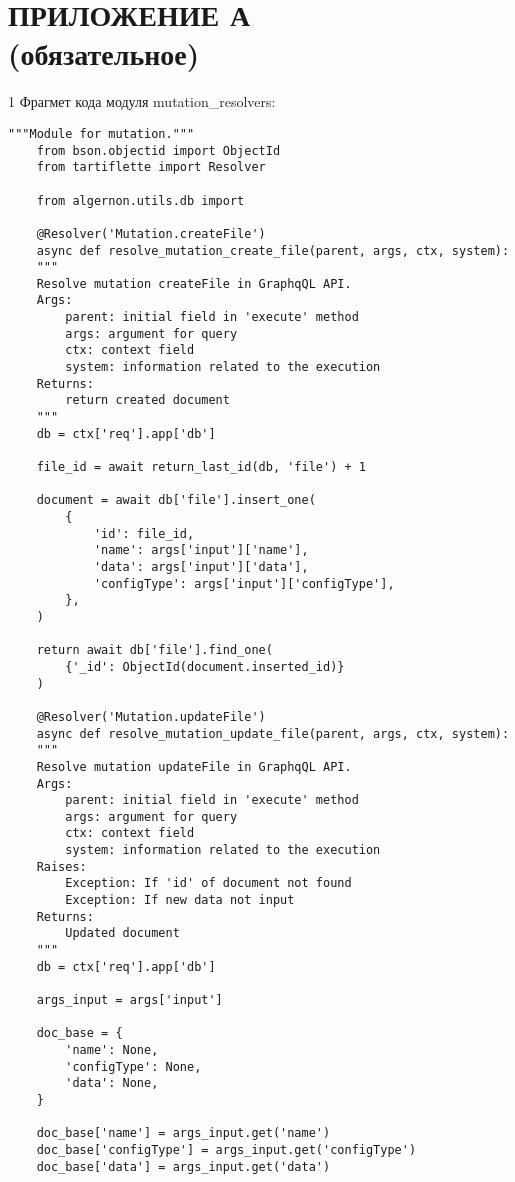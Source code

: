 \section*{\hfill ПРИЛОЖЕНИЕ А \\ \hspace*{13.5cm} (обязательное)}


1 Фрагмет кода модуля mutation\_resolvers:

\begin{Verbatim}[fontsize=\footnotesize]
    """Module for mutation."""
    from bson.objectid import ObjectId
    from tartiflette import Resolver

    from algernon.utils.db import 

    @Resolver('Mutation.createFile')
    async def resolve_mutation_create_file(parent, args, ctx, system):
    """
    Resolve mutation createFile in GraphqQL API.
    Args:
        parent: initial field in 'execute' method
        args: argument for query
        ctx: context field
        system: information related to the execution
    Returns:
        return created document
    """
    db = ctx['req'].app['db']

    file_id = await return_last_id(db, 'file') + 1

    document = await db['file'].insert_one(
        {
            'id': file_id,
            'name': args['input']['name'],
            'data': args['input']['data'],
            'configType': args['input']['configType'],
        },
    )

    return await db['file'].find_one(
        {'_id': ObjectId(document.inserted_id)}
    )

    @Resolver('Mutation.updateFile')
    async def resolve_mutation_update_file(parent, args, ctx, system):
    """
    Resolve mutation updateFile in GraphqQL API.
    Args:
        parent: initial field in 'execute' method
        args: argument for query
        ctx: context field
        system: information related to the execution
    Raises:
        Exception: If 'id' of document not found
        Exception: If new data not input
    Returns:
        Updated document
    """
    db = ctx['req'].app['db']

    args_input = args['input']

    doc_base = {
        'name': None,
        'configType': None,
        'data': None,
    }

    doc_base['name'] = args_input.get('name')
    doc_base['configType'] = args_input.get('configType')
    doc_base['data'] = args_input.get('data')


\end{Verbatim}
